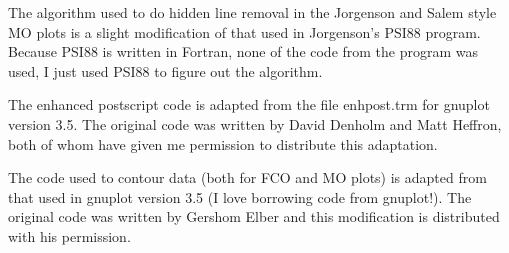 The algorithm used to do hidden line removal in the Jorgenson and
Salem style MO plots is a slight modification of that used in
Jorgenson's {\sf PSI88} program.  Because {\sf PSI88} is written in
Fortran, none 
of the code from the program was used, I just used {\sf PSI88} to
figure out the algorithm.

The enhanced postscript code is adapted from the file enhpost.trm for
{\sf gnuplot} version 3.5.  The original code was written by David Denholm
and Matt Heffron, both of whom have given me permission to distribute
this adaptation. 

The code used to contour data (both for FCO and MO plots) is adapted
from that used in {\sf gnuplot} version 3.5 (I love borrowing code from
{\sf gnuplot}!).  The original code was written by Gershom Elber and this
modification is distributed with his permission.

